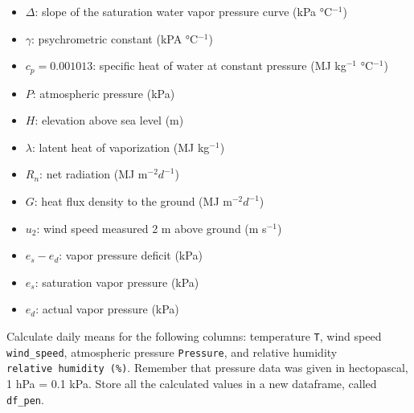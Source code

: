 \documentclass[
  letterpaper,
  DIV=11,
  numbers=noendperiod]{scrreprt}
\providecommand{\tightlist}{%
  \setlength{\itemsep}{0pt}\setlength{\parskip}{0pt}}\usepackage{longtable,booktabs,array}
\begin{document}
\begin{itemize}
\tightlist
\item
  \(\Delta\): slope of the saturation water vapor pressure curve (kPa
  °C\(^{-1}\))
\item
  \(\gamma\): psychrometric constant (kPA °C\(^{-1}\))
\item
  \(c_p=0.001013\): specific heat of water at constant pressure (MJ
  kg\(^{-1}\) °C\(^{-1}\))
\item
  \(P\): atmospheric pressure (kPa)
\item
  \(H\): elevation above sea level (m)
\item
  \(\lambda\): latent heat of vaporization (MJ kg\(^{-1}\))
\item
  \(R_n\): net radiation (MJ m\(^{-2} d^{-1}\))
\item
  \(G\): heat flux density to the ground (MJ m\(^{-2} d^{-1}\))
\item
  \(u_{2}\): wind speed measured 2 m above ground (m s\(^{-1}\))
\item
  \(e_{s} - e_{d}\): vapor pressure deficit (kPa)
\item
  \(e_{s}\): saturation vapor pressure (kPa)
\item
  \(e_{d}\): actual vapor pressure (kPa)
\end{itemize}

Calculate daily means for the following columns: temperature \texttt{T},
wind speed \texttt{wind\_speed}, atmospheric pressure \texttt{Pressure},
and relative humidity \texttt{relative\ humidity\ (\%)}. Remember that
pressure data was given in hectopascal, 1 hPa = 0.1 kPa. Store all the
calculated values in a new dataframe, called \texttt{df\_pen}.
\end{document}
